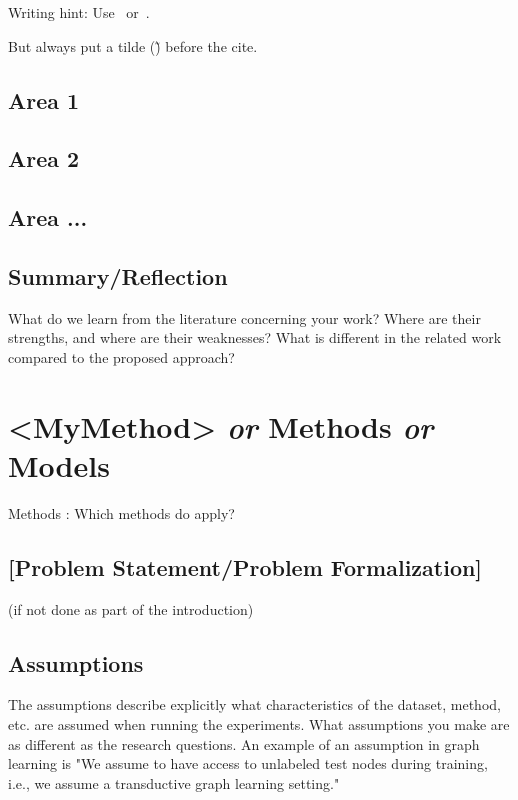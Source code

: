 \documentclass[sigconf, nonacm]{acmart}
\begin{document}
Writing hint:
%
Use~\cite{Abril07}
or~\citet{Abril07}.

But always put a tilde (\~) before the cite.

\subsection{Area 1}

\subsection{Area 2}

\subsection{Area ...}

\subsection{Summary/Reflection}

What do we learn from the literature concerning your work?
Where are their strengths, and where are their weaknesses?
What is different in the related work compared to the proposed approach?

\section{<MyMethod> \textit{or} Methods \textit{or} Models}
\label{sec:methods}

Methods : Which methods do apply?

\subsection{[Problem Statement/Problem Formalization]}
\label{sec:problemstatement}

(if not done as part of the introduction)

\subsection{Assumptions}

\begin{tcolorbox}
[title=Assumptions: What are assumptions?]
The assumptions describe explicitly what characteristics of the dataset, method, etc. are assumed when running the experiments. What assumptions you make are as different as the research questions. An example of an assumption in graph learning is "We assume to have access to unlabeled test nodes during training, i.e., we assume a transductive graph learning setting."
\end{tcolorbox}
\end{document}
